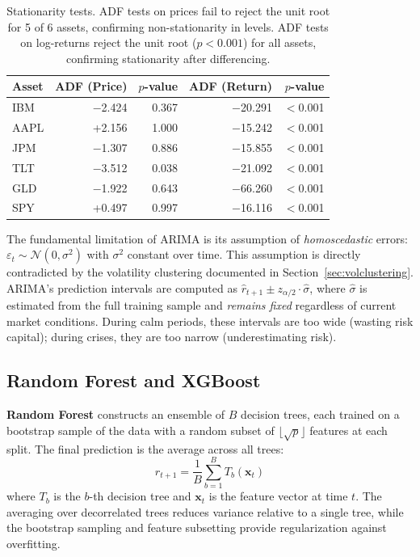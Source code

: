 \documentclass[11pt,a4paper]{article}
\begin{document}
\begin{table}[H]
\centering
\caption{Stationarity tests. ADF tests on prices fail to reject the unit root for 5 of 6 assets, confirming non-stationarity in levels. ADF tests on log-returns reject the unit root ($p < 0.001$) for all assets, confirming stationarity after differencing.}
\label{tab:adf}
\small
\begin{tabular}{@{}lrrrr@{}}
\toprule
\textbf{Asset} & \textbf{ADF (Price)} & \textbf{$p$-value} & \textbf{ADF (Return)} & \textbf{$p$-value} \\
\midrule
IBM  & $-$2.424 & 0.367 & $-$20.291 & $<$0.001 \\
AAPL & +2.156   & 1.000 & $-$15.242 & $<$0.001 \\
JPM  & $-$1.307 & 0.886 & $-$15.855 & $<$0.001 \\
TLT  & $-$3.512 & 0.038 & $-$21.092 & $<$0.001 \\
GLD  & $-$1.922 & 0.643 & $-$66.260 & $<$0.001 \\
SPY  & +0.497   & 0.997 & $-$16.116 & $<$0.001 \\
\bottomrule
\end{tabular}
\end{table}

The fundamental limitation of ARIMA is its assumption of \emph{homoscedastic} errors: $\varepsilon_t \sim \mathcal{N}(0, \sigma^2)$ with $\sigma^2$ constant over time.
This assumption is directly contradicted by the volatility clustering documented in Section~\ref{sec:volclustering}.
ARIMA's prediction intervals are computed as $\hat{r}_{t+1} \pm z_{\alpha/2} \cdot \hat{\sigma}$, where $\hat{\sigma}$ is estimated from the full training sample and \emph{remains fixed} regardless of current market conditions.
During calm periods, these intervals are too wide (wasting risk capital); during crises, they are too narrow (underestimating risk).

\subsection{Random Forest and XGBoost}
\label{sec:ml}

\textbf{Random Forest} \citep{breiman2001} constructs an ensemble of $B$ decision trees, each trained on a bootstrap sample of the data with a random subset of $\lfloor\sqrt{p}\rfloor$ features at each split.
The final prediction is the average across all trees:
\begin{equation}
\label{eq:rf}
\hat{r}_{t+1} = \frac{1}{B}\sum_{b=1}^{B} T_b(\mathbf{x}_t)
\end{equation}
where $T_b$ is the $b$-th decision tree and $\mathbf{x}_t$ is the feature vector at time $t$.
The averaging over decorrelated trees reduces variance relative to a single tree, while the bootstrap sampling and feature subsetting provide regularization against overfitting.
\end{document}
